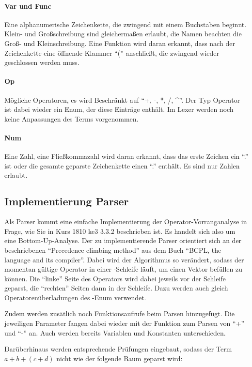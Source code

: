 \documentclass[11pt,a4paper, ngerman]{article}
\begin{document}
\paragraph{Var und Func} Eine alphanumerische Zeichenkette, die zwingend mit einem Buchstaben beginnt. Klein- und Großschreibung sind gleichermaßen erlaubt, die Namen beachten die Groß- und Kleinschreibung. Eine Funktion wird daran erkannt, dass nach der Zeichenkette eine öffnende Klammer ``('' anschließt, die zwingend wieder geschlossen werden muss.

\paragraph{Op} Mögliche Operatoren, es wird Beschränkt auf ``+, -, *, /, \^{}''. Der Typ Operator ist dabei wieder ein Enum, der diese Einträge enthält. Im Lexer werden noch keine Anpassungen des Terms vorgenommen.

\paragraph{Num} Eine Zahl, eine Fließkommazahl wird daran erkannt, dass das erste Zeichen ein ``.'' ist oder die gesamte geparste Zeichenkette einen ``.'' enthält. Es sind nur Zahlen erlaubt.

\subsection{Implementierung Parser}
Als Parser kommt eine einfache Implementierung der Operator-Vorranganalyse in Frage, wie Sie in Kurs 1810 ke3 3.3.2 beschrieben ist. Es handelt sich also um eine Bottom-Up-Analyse. Der zu implementierende Parser orientiert sich an der beschriebenen ``Precedence climbing method'' aus dem Buch ``BCPL, the language and its compiler''. Dabei wird der Algorithmus so verändert, sodass der momentan gültige Operator in einer -Schleife läuft, um einen Vektor befüllen zu können. Die ``linke'' Seite des Operators wird dabei jeweils vor der Schleife geparst, die ``rechten'' Seiten dann in der Schleife. Dazu werden auch gleich Operatorenüberladungen des -Enum verwendet.

Zudem werden zusätlich noch Funktionsaufrufe beim Parsen hinzugefügt. Die jeweiligen Parameter fangen dabei wieder mit der Funktion zum Parsen von ``+'' und ``-'' an. Auch werden bereits Variablen und Konstanten unterschieden.

Darüberhinaus werden entsprechende Prüfungen eingebaut, sodass der Term $a+b+(c+d)$ nicht wie der folgende Baum geparst wird:
\end{document}
